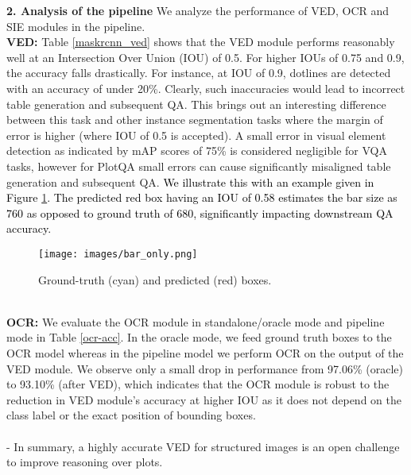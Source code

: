 \documentclass[10pt,twocolumn,letterpaper]{article}
\begin{document}
\noindent \textbf{2. Analysis of the pipeline}
We analyze the performance of VED, OCR and SIE modules in the pipeline. \\
\noindent \textbf{VED:} Table \ref{maskrcnn_ved} shows that the VED module performs reasonably well at an Intersection Over Union (IOU) of 0.5.
For higher IOUs of 0.75 and 0.9, the accuracy falls drastically. For instance, at IOU of 0.9, dotlines are detected with an accuracy of under 20\%.
Clearly, such inaccuracies would lead to incorrect table generation and subsequent QA.
This brings out an interesting difference between this task and other instance segmentation tasks where the margin of error is higher (where IOU of 0.5 is accepted).
A small error in visual element detection as indicated by mAP scores of 75\% is considered negligible for VQA tasks, however for PlotQA small errors can cause significantly misaligned table generation and subsequent QA.
\textcolor{black}{We illustrate this with an example given in Figure \ref{VED}. The predicted red box having an IOU of 0.58 estimates the bar size as 760 as opposed to ground truth of 680, significantly impacting downstream QA accuracy.} 
\begin{figure}[h!]
\begin{center}
\texttt{[image: images/bar\_only.png]}
\caption{Ground-truth (cyan) and predicted (red) boxes.}
\label{VED}
\end{center}
\end{figure}
\\
\noindent \textbf{OCR:} We evaluate the OCR module in standalone/oracle mode and pipeline mode in Table \ref{ocr-acc}.  In the oracle mode, we feed ground truth boxes to the OCR model whereas in the pipeline model we perform OCR on the output of the VED module. We observe only a small drop in performance from 97.06\% (oracle) to 93.10\% (after VED), which indicates that the OCR module is robust to the reduction in VED module's accuracy at higher IOU as it does not depend on the class label or the exact position of bounding boxes. \\
\\
- In summary, a highly accurate VED for structured images is an open challenge to improve reasoning over plots. 
\end{document}
